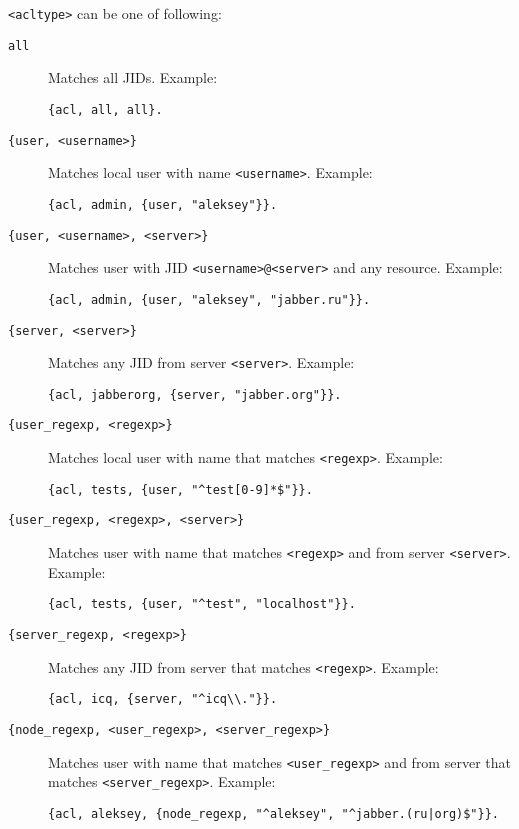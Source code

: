 \documentclass[10pt]{article}
\begin{document}
\texttt{<acltype>} can be one of following:
\begin{description}
\item[\texttt{all}] Matches all JIDs.  Example:
\begin{verbatim}
{acl, all, all}.
\end{verbatim}
\item[\texttt{\{user, <username>\}}] Matches local user with name
  \texttt{<username>}.  Example:
\begin{verbatim}
{acl, admin, {user, "aleksey"}}.
\end{verbatim}
\item[\texttt{\{user, <username>, <server>\}}] Matches user with JID
  \texttt{<username>@<server>} and any resource.  Example:
\begin{verbatim}
{acl, admin, {user, "aleksey", "jabber.ru"}}.
\end{verbatim}
\item[\texttt{\{server, <server>\}}] Matches any JID from server
  \texttt{<server>}.  Example:
\begin{verbatim}
{acl, jabberorg, {server, "jabber.org"}}.
\end{verbatim}
\item[\texttt{\{user\_regexp, <regexp>\}}] Matches local user with name that
  matches \texttt{<regexp>}.  Example:
\begin{verbatim}
{acl, tests, {user, "^test[0-9]*$"}}.
\end{verbatim}
\item[\texttt{\{user\_regexp, <regexp>, <server>\}}] Matches user with name
  that matches \texttt{<regexp>} and from server \texttt{<server>}.  Example:
\begin{verbatim}
{acl, tests, {user, "^test", "localhost"}}.
\end{verbatim}
\item[\texttt{\{server\_regexp, <regexp>\}}] Matches any JID from server that
  matches \texttt{<regexp>}.  Example:
\begin{verbatim}
{acl, icq, {server, "^icq\\."}}.
\end{verbatim}
\item[\texttt{\{node\_regexp, <user\_regexp>, <server\_regexp>\}}] Matches user
  with name that matches \texttt{<user\_regexp>} and from server that matches
  \texttt{<server\_regexp>}.  Example:
\begin{verbatim}
{acl, aleksey, {node_regexp, "^aleksey", "^jabber.(ru|org)$"}}.
\end{verbatim}

\end{description}
\end{document}
